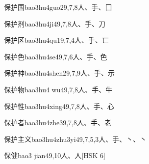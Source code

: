 \begin{EntryWithPhonetic}{保护国}{bao3hu4guo2}{9,7,8}{⼈、⼿、⼞}
\end{EntryWithPhonetic}

\begin{EntryWithPhonetic}{保护剂}{bao3hu4ji4}{9,7,8}{⼈、⼿、⼑}
\end{EntryWithPhonetic}

\begin{EntryWithPhonetic}{保护区}{bao3hu4qu1}{9,7,4}{⼈、⼿、⼖}
\end{EntryWithPhonetic}

\begin{EntryWithPhonetic}{保护色}{bao3hu4se4}{9,7,6}{⼈、⼿、⾊}
\end{EntryWithPhonetic}

\begin{EntryWithPhonetic}{保护神}{bao3hu4shen2}{9,7,9}{⼈、⼿、⽰}
\end{EntryWithPhonetic}

\begin{EntryWithPhonetic}{保护物}{bao3hu4 wu4}{9,7,8}{⼈、⼿、⽜}
\end{EntryWithPhonetic}

\begin{EntryWithPhonetic}{保护性}{bao3hu4xing4}{9,7,8}{⼈、⼿、⼼}
\end{EntryWithPhonetic}

\begin{EntryWithPhonetic}{保护者}{bao3hu4zhe3}{9,7,8}{⼈、⼿、⽼}
\end{EntryWithPhonetic}

\begin{EntryWithPhonetic}{保护主义}{bao3hu4zhu3yi4}{9,7,5,3}{⼈、⼿、⼂、⼂}
\end{EntryWithPhonetic}

\begin{EntryWithPhonetic}{保健}{bao3 jian4}{9,10}{⼈、⼈}[HSK 6]
\end{EntryWithPhonetic}

